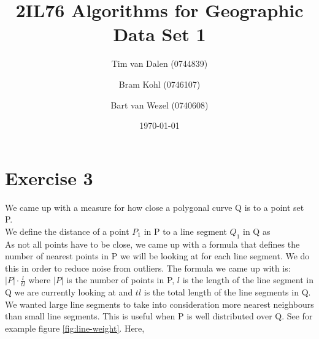 \documentclass[a4paper,11pt]{article}
\title{
	2IL76 Algorithms for Geographic Data Set 1 \\
}
\author{
	Tim van Dalen (0744839)
	\and
	Bram Kohl (0746107)
	\and
	Bart van Wezel (0740608)
}
\date{\today}
\begin{document}
	\maketitle
	
\section*{Exercise 3}
We came up with a measure for how close a polygonal curve Q is to a point set P.\\

We define the distance of a point $P_1$ in P to a line segment $Q_1$ in Q as \\%

As not all points have to be close, we came up with a formula that defines the number of nearest points in P we will be looking at for each line segment. We do this in order to reduce noise from outliers. The formula we came up with is: $|P|\cdot \frac{l}{tl}$ where $|P|$ is the number of points in P, $l$ is the length of the line segment in Q we are currently looking at and $tl$ is the total length of the line segments in Q.\\

We wanted large line segments to take into consideration more nearest neighbours than small line segments. This is useful when P is well distributed over Q. See for example figure \ref{fig:line-weight}. Here, 


 
	
\end{document}
